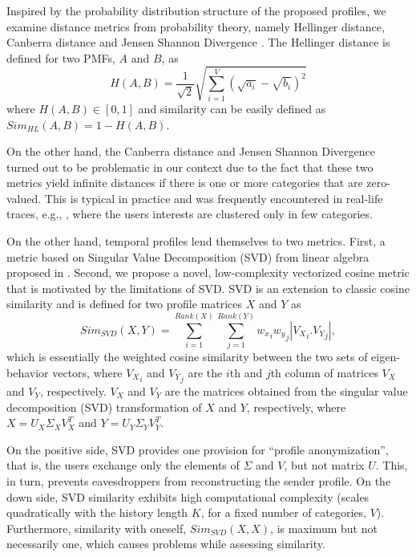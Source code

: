 \documentclass[conference]{IEEEtran}
\theoremstyle{definition}
\begin{document}
Inspired by the probability distribution structure of the proposed 
profiles, we examine distance metrics from probability theory, 
namely Hellinger distance, Canberra distance and Jensen Shannon 
Divergence \cite{sm}. The Hellinger distance is defined for two 
PMFs, $A$ and $B$, as \cite{sm} 
\begin{equation}
H(A,B)= \frac{1}{\sqrt{2}}\sqrt{ \sum\limits_{i=1}^{V}{(\sqrt{a_i}-\sqrt{b_i})^2}} 
\nonumber
\end{equation}
where $H(A,B) \in [0,1]$ and similarity can be easily defined as $Sim_{HL}(A, B)=1-H(A,B)$.

On the other hand, the Canberra distance and Jensen Shannon 
Divergence turned out to be problematic in our context due to 
the fact that these two metrics yield infinite distances if there is 
one or more categories that are zero-valued. This is typical in practice 
and was frequently encountered in real-life traces, e.g., \cite{data}, 
where the users interests are clustered only in few categories.


On the other hand, temporal profiles lend themselves to two metrics. 
First, a metric based on Singular Value Decomposition (SVD) from linear 
algebra proposed in \cite{csi}. Second, we propose a novel, low-complexity vectorized 
cosine metric that is motivated by the limitations of SVD. 
SVD is an extension to classic cosine similarity and is defined for two profile
matrices $X$ and $Y$ as
\begin{equation}
\label{simEq}
Sim_{SVD}(X,Y)=\sum\limits_{i=1}^{Rank(X)} \sum\limits_{j=1}^{Rank(Y)} {w_x}_i {w_y}_j |{V_X}_i.{V_Y}_j|,
\end{equation}
which is essentially the weighted cosine similarity between the two sets of eigen-behavior vectors, where ${V_X}_i$ and ${V_Y}_j$ are the $i$th and $j$th column of matrices $V_X$ and $V_Y$, respectively. $V_X$ and $V_Y$ are the matrices obtained from the singular value decomposition (SVD) transformation \cite{svd} of $X$ and $Y$, respectively, where $X = U_X \Sigma_X V_X^T$ and $Y = U_Y \Sigma_Y V_Y^T$. 

On the positive side, SVD provides one provision for ``profile anonymization'', that is, the users exchange only the elements of $\Sigma$ and $V$, but not matrix $U$. This, 
in turn, prevents eavesdroppers from reconstructing the sender profile.
On the down side, SVD similarity exhibits high computational complexity (scales 
quadratically with the history length $K$, for a fixed number of categories, $V$). 
Furthermore, similarity with oneself, $Sim_{SVD}(X,X)$, is maximum but not necessarily 
one, which causes problems while assessing similarity.
\end{document}
